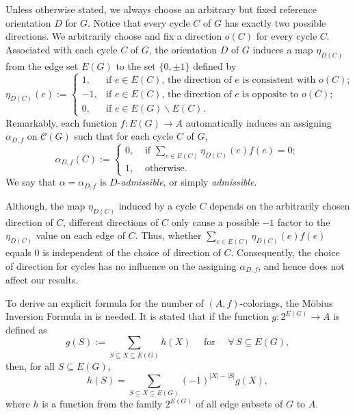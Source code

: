 \documentclass[12pt]{article}%
\numberwithin{equation}{section}
\begin{document}
 
Unless otherwise stated, we always choose an arbitrary but fixed reference orientation $D$ for $G$. Notice that every cycle $C$ of $G$ has exactly two possible directions. We arbitrarily choose and fix a direction $o(C)$ for every cycle $C$. Associated with each cycle $C$ of $G$, the orientation $D$ of $G$ induces a map $\eta_{D(C)}$ from the edge set $E(G)$ to the set $\{0,\pm1\}$ defined by
\begin{equation}\label{Primitive-Chain}
\eta_{D(C)}(e):=
\begin{cases}
1,&  \mbox{if  $e\in E(C)$, the direction of $e$ is consistent with $o(C)$};\\
-1,& \mbox{if  $e\in E(C)$, the direction of $e$ is opposite to $o(C)$};\\
0, & \mbox{if  $e\in E(G)\smallsetminus E(C)$}.
\end{cases}
\end{equation}
Remarkably, each function $f:E(G)\to A$ automatically induces an assigning $\alpha_{D,f}$ on $\mathcal{C}(G)$ such that for each cycle $C$ of $G$,
\[
\alpha_{D,f}(C):=\begin{cases}
0,& \mbox{ if } \sum_{e\in E(C)}\eta_{D(C)}(e)f(e)=0;\\
1,& \mbox{ otherwise}.
\end{cases}
\]
We say that $\alpha=\alpha_{D,f}$ is $D$-{\em admissible}, or simply {\em admissible}. 

Although, the map $\eta_{D(C)}$ induced by a cycle $C$ depends on the arbitrarily chosen direction of $C$, different directions of $C$ only cause a possible $-1$ factor to the $\eta_{D(C)}$ value on each edge of $C$. Thus,  whether $\sum_{e\in E(C)}\eta_{D(C)}(e)f(e)$ equals $0$ is independent of the choice of direction of $C$. Consequently, the choice of direction for cycles has no influence on the assigning $\alpha_{D,f}$, and hence does not affect our results.

To derive an explicit formula for the number of $(A,f)$-colorings, the M\"obius Inversion Formula in \cite[Theorem 2.25]{Bondy2008} is needed. It is stated that if the function $g: 2^{E(G)}\to A$ is defined as
\[
g(S):=\sum_{S\subseteq X\subseteq E(G)}h(X) \quad\mbox{ for }\quad \forall\,S\subseteq E(G),
\]
then, for all $S\subseteq E(G)$,
\begin{equation}\label{Inversion}
h(S)=\sum_{S\subseteq X\subseteq E(G)}(-1)^{|X|-|S|}g(X),
\end{equation}
where $h$ is a function from the family $2^{E(G)}$ of all edge subsets of $G$ to $A$. 
\end{document}
